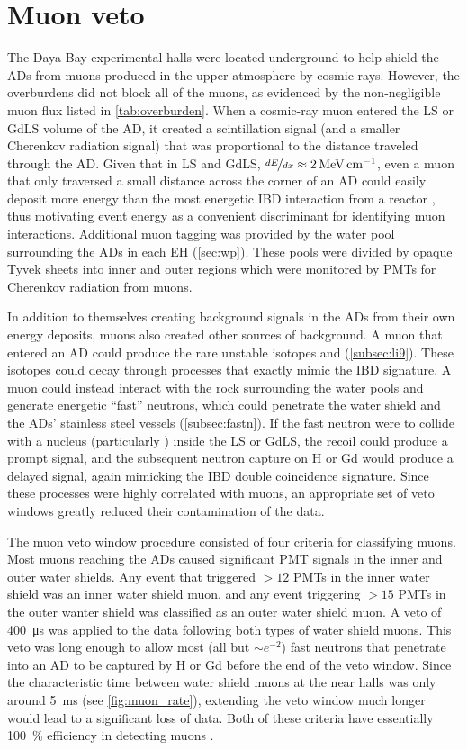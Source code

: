 \section{Muon veto}
\label{sec:muonveto}

The Daya Bay experimental halls were located underground
to help shield the ADs from muons produced in the upper atmosphere by cosmic rays.
However, the overburdens did not block all of the muons,
as evidenced by the non-negligible muon flux listed in \cref{tab:overburden}.
When a cosmic-ray muon entered the LS or GdLS volume of the AD,
it created a scintillation signal (and a smaller Cherenkov radiation signal)
that was proportional to the distance traveled
through the AD.
Given that in LS and GdLS, $\nicefrac{dE}{dx} \approx \SI{2}{\mev\per\cm}$,
even a muon that only traversed a small distance across the corner of an AD could easily deposit
more energy than the most energetic IBD interaction from a reactor \nuebar,
thus motivating event energy as a convenient discriminant for identifying muon interactions.
Additional muon tagging was provided by the water pool
surrounding the ADs in each EH (\cref{sec:wp}).
These pools were divided by opaque Tyvek sheets into inner and outer regions
which were monitored by PMTs for Cherenkov radiation from muons.

In addition to themselves creating background signals in the ADs
from their own energy deposits,
muons also created other sources of background.
A muon that entered an AD could produce
the rare unstable isotopes \li{} and \he{} (\cref{subsec:li9}).
These isotopes could decay through processes that exactly mimic the IBD signature.
A muon could instead interact with the rock surrounding the water pools
and generate energetic ``fast'' neutrons,
which could penetrate the water shield and the ADs' stainless steel vessels
(\cref{subsec:fastn}).
If the fast neutron were to collide with a nucleus (particularly )
inside the LS or GdLS,
the recoil could produce a prompt signal,
and the subsequent neutron capture on H or Gd would produce
a delayed signal, again mimicking the IBD double coincidence signature.
Since these processes were highly correlated with muons,
an appropriate set of veto windows greatly reduced their contamination of the data.

The muon veto window procedure consisted of four criteria
for classifying muons.
Most muons reaching the ADs caused significant PMT signals in the inner and outer water shields.
Any event that triggered $>12$ PMTs in the inner water shield
was an inner water shield muon,
and any event triggering $>15$ PMTs in the outer wanter shield
was classified as an outer water shield muon.
A veto of \SI{400}{\micro\second} was applied to the data following
both types of water shield muons.
This veto was long enough to allow most (all but ${\sim}e^{-2}$)
fast neutrons that penetrate into an AD to be captured by H or Gd
before the end of the veto window.
Since the characteristic time between water shield muons at the near halls
was only around \SI{5}{\milli\second} (see \cref{fig:muon_rate}),
extending the veto window much longer would lead to a significant
loss of data.
Both of these criteria have essentially \SI{100}{\percent} efficiency
in detecting muons \cite{muonsystem2015}.

